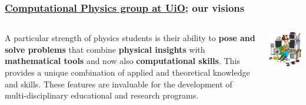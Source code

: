 \documentclass{beamer}
\begin{document}
\begin{frame}
\frametitle{\href{{http://www.mn.uio.no/fysikk/english/research/groups/computational/index.html}}{Computational Physics group at UiO}; our visions}

\begin{columns}
\begin{block}{}
A particular strength of physics students is their ability to \textbf{pose and
solve problems} that combine \textbf{physical insights} with \textbf{mathematical tools}
and now also \textbf{computational skills}. This provides a unique combination
of applied and theoretical knowledge and skills. These features are invaluable
for the development of multi-disciplinary educational and research programs.
\end{block}

\centerline{\includegraphics[width=1.0\linewidth]{fig-future/computer_nerd2.jpg}}



\end{columns}
\end{frame}
\end{document}
